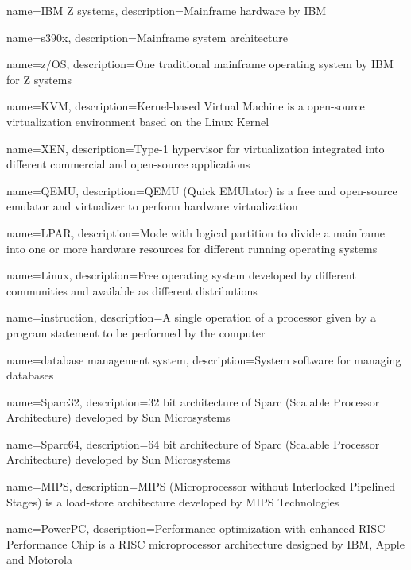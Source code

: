 {
    name={IBM Z systems},
    description={Mainframe hardware by IBM}
}

{
    name={s390x},
    description={Mainframe system architecture}
}

{
    name={z/OS},
    description={One traditional mainframe operating system by IBM for Z systems}
}

{
    name={KVM},
    description={Kernel-based Virtual Machine is a open-source virtualization environment based on the Linux Kernel}
}

{
    name={XEN},
    description={Type-1 hypervisor for virtualization integrated into different commercial and open-source applications}
}

{
    name={QEMU},
    description={QEMU (Quick EMUlator) is a free and open-source emulator and virtualizer to perform hardware virtualization}
}

{
    name={LPAR},
    description={Mode with logical partition to divide a mainframe into one or more hardware resources for different running operating systems}
}

{
    name={Linux},
    description={Free operating system developed by different communities and available as different distributions}
}

{
    name={instruction},
    description={A single operation of a processor given by a program statement to be performed by the computer}
}

{
    name={database management system},
    description={System software for managing databases}
}

{
    name={Sparc32},
    description={32 bit architecture of Sparc (Scalable Processor Architecture) developed by Sun Microsystems}
}

{
    name={Sparc64},
    description={64 bit architecture of Sparc (Scalable Processor Architecture) developed by Sun Microsystems}
}

{
    name={MIPS},
    description={MIPS (Microprocessor without Interlocked Pipelined Stages) is a load-store architecture developed by MIPS Technologies}
}

{
    name={PowerPC},
    description={Performance optimization with enhanced RISC Performance Chip is a RISC microprocessor architecture designed by IBM, Apple and Motorola}
}

